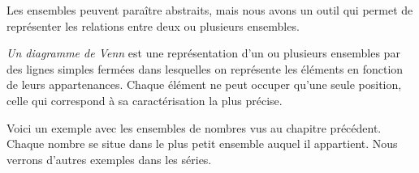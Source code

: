 \documentclass[a4paper,12pt]{report}
\begin{document}
Les ensembles peuvent paraître abstraits, mais nous avons un outil qui permet de représenter les relations entre deux ou plusieurs ensembles.

\begin{defi}
\emph{Un diagramme de Venn} est une représentation d'un ou plusieurs ensembles par des lignes simples fermées dans lesquelles on représente les éléments en fonction de leurs appartenances. 
Chaque élément ne peut occuper qu'une seule position, celle qui correspond à sa caractérisation la plus précise.
\end{defi}

Voici un exemple avec les ensembles de nombres vus au chapitre précédent.
Chaque nombre se situe dans le plus petit ensemble auquel il appartient. 
Nous verrons d'autres exemples dans les séries.
\begin{center}
	\def\natEl{(0,0) ellipse (2cm and 1cm)}
	\def\intEl{(0.5,0) ellipse (3cm and 2cm)}
	\def\ratEl{(1,0) ellipse (4cm and 3cm)}
	\def\realEl{(1.5,0) ellipse (5cm and 4cm)}
\end{center}
\end{document}
